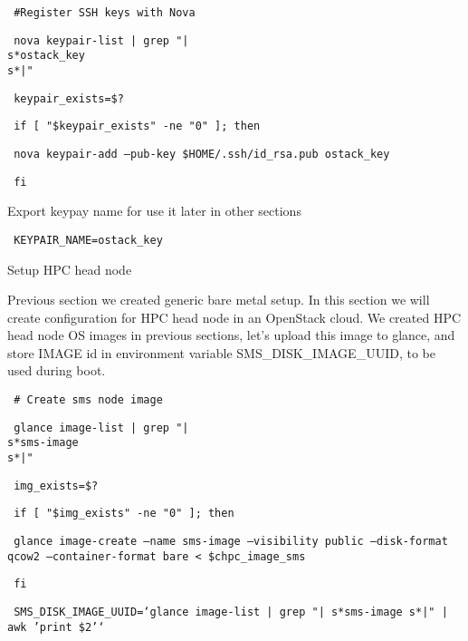 \documentclass[12pt]{article}
\begin{document}
\begin{bash}\texttt{\small{ \#Register SSH keys with Nova}}\end{bash}
\begin{bash}\texttt{\small{  nova keypair-list | grep "|\\s*ostack\_key\\s*|"}}\end{bash}
\begin{bash}\texttt{\small{  keypair\_exists=\$?}}\end{bash}
\begin{bash}\texttt{\small{  if [ "\${keypair\_exists}" -ne "0" ]; then}}\end{bash}
\begin{bash}\texttt{\small{     nova keypair-add --pub-key \${HOME}/.ssh/id\_rsa.pub ostack\_key}}\end{bash}
\begin{bash}\texttt{\small{  fi}}\end{bash}

Export keypay name for use it later in other sections

\begin{bash}\texttt{\small{     KEYPAIR\_NAME=ostack\_key}}\end{bash}

Setup HPC head node

Previous section we created generic bare metal setup. In this section we will create configuration for HPC head node in an OpenStack cloud.
We created HPC head node OS images in previous sections, let’s upload this image to glance, and store IMAGE id in environment variable SMS\_DISK\_IMAGE\_UUID, to be used during boot. 

\begin{bash}\texttt{\small{ \# Create sms node image}}\end{bash}
\begin{bash}\texttt{\small{    glance image-list | grep "|\\s*sms-image\\s*|"}}\end{bash}
\begin{bash}\texttt{\small{    img\_exists=\$?}}\end{bash}
\begin{bash}\texttt{\small{    if [ "\${img\_exists}" -ne "0" ]; then}}\end{bash}
\begin{bash}\texttt{\small{        glance image-create --name sms-image --visibility public --disk-format qcow2 --container-format bare < \${chpc\_image\_sms}}}\end{bash}
\begin{bash}\texttt{\small{    fi}}\end{bash}
\begin{bash}\texttt{\small{    SMS\_DISK\_IMAGE\_UUID=`glance image-list | grep "|\\s*sms-image\\s*|" | awk '{print \$2}'`}}\end{bash}
\end{document}

